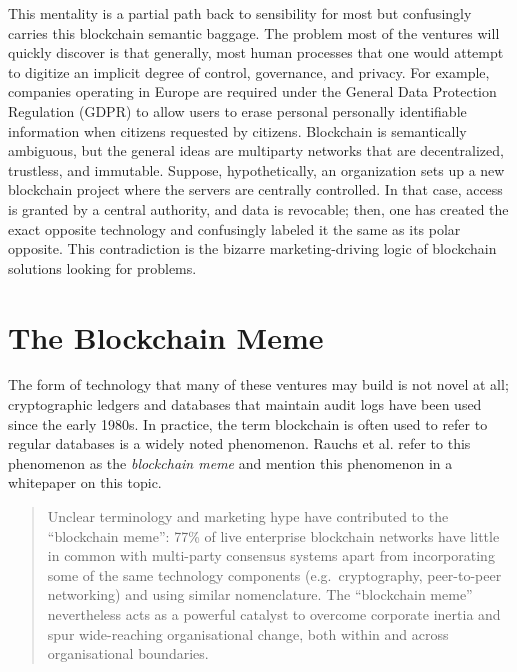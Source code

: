 This mentality is a partial path back to sensibility for most but confusingly
carries this blockchain semantic baggage. The problem most of the ventures will
quickly discover is that generally, most human processes that one would attempt
to digitize an implicit degree of control, governance, and privacy. For example,
companies operating in Europe are required under the General Data Protection
Regulation (GDPR) to allow users to erase personal personally identifiable
information when citizens requested by citizens. Blockchain is semantically
ambiguous, but the general ideas are multiparty networks that are decentralized,
trustless, and immutable. Suppose, hypothetically, an organization sets up a new
blockchain project where the servers are centrally controlled. In that case,
access is granted by a central authority, and data is revocable; then, one has
created the exact opposite technology and confusingly labeled it the same as its
polar opposite. This contradiction is the bizarre marketing-driving logic of
blockchain solutions looking for problems. \cite{babu_behind_2020,
halpin_deconstructing_2020}


\section{The Blockchain Meme}


The form of technology that many of these ventures may build is not novel at
all; cryptographic ledgers and databases that maintain audit logs have been used
since the early 1980s. In practice, the term blockchain is often used to refer
to regular databases is a widely noted phenomenon. Rauchs et al. refer to this
phenomenon as the \textit{blockchain meme} and mention this phenomenon in a
whitepaper on this topic. \cite{rauchs_2nd_2019}

\begin{quote}
Unclear terminology and marketing hype have contributed to the
``blockchain meme'': 77\% of live enterprise blockchain networks have
little in common with multi-party consensus systems apart from
incorporating some of the same technology components (e.g.~cryptography,
peer-to-peer networking) and using similar nomenclature. The
``blockchain meme'' nevertheless acts as a powerful catalyst to overcome
corporate inertia and spur wide-reaching organisational change, both
within and across organisational boundaries.
\end{quote}


